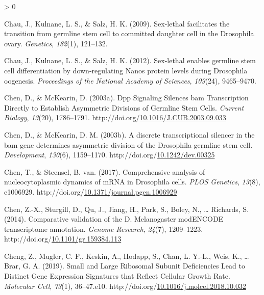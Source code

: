 \documentclass[12pt,oneside]{reedthesis}
\newlength{\cslhangindent}
\newenvironment{CSLReferences}[2] %
 {%
  \setlength{\parindent}{0pt}
  \ifodd #1 \everypar{\setlength{\hangindent}{\cslhangindent}}\ignorespaces\fi
  \ifnum #2 > 0
  \setlength{\parskip}{#2\baselineskip}
  \fi
 }%
 {}
\begin{document}
\begin{CSLReferences}{1}{0}
\leavevmode\hypertarget{ref-Chau2009}{}%
Chau, J., Kulnane, L. S., \& Salz, H. K. (2009). Sex-lethal facilitates the transition from germline stem cell to committed daughter cell in the {Drosophila} ovary. \emph{Genetics}, \emph{182}(1), 121--132.

\leavevmode\hypertarget{ref-Chau2012}{}%
Chau, J., Kulnane, L. S., \& Salz, H. K. (2012). Sex-lethal enables germline stem cell differentiation by down-regulating {Nanos} protein levels during {Drosophila} oogenesis. \emph{Proceedings of the National Academy of Sciences}, \emph{109}(24), 9465--9470.

\leavevmode\hypertarget{ref-Chen2003o}{}%
Chen, D., \& McKearin, D. (2003a). Dpp {Signaling Silences} bam {Transcription Directly} to {Establish Asymmetric Divisions} of {Germline Stem Cells}. \emph{Current Biology}, \emph{13}(20), 1786--1791. http://doi.org/\href{https://doi.org/10.1016/J.CUB.2003.09.033}{10.1016/J.CUB.2003.09.033}

\leavevmode\hypertarget{ref-Chen2003q}{}%
Chen, D., \& McKearin, D. M. (2003b). A discrete transcriptional silencer in the bam gene determines asymmetric division of the {Drosophila} germline stem cell. \emph{Development}, \emph{130}(6), 1159--1170. http://doi.org/\href{https://doi.org/10.1242/dev.00325}{10.1242/dev.00325}

\leavevmode\hypertarget{ref-chenComprehensiveAnalysisNucleocytoplasmic2017}{}%
Chen, T., \& Steensel, B. van. (2017). Comprehensive analysis of nucleocytoplasmic dynamics of {mRNA} in {Drosophila} cells. \emph{PLOS Genetics}, \emph{13}(8), e1006929. http://doi.org/\href{https://doi.org/10.1371/journal.pgen.1006929}{10.1371/journal.pgen.1006929}

\leavevmode\hypertarget{ref-chenComparativeValidationMelanogaster2014}{}%
Chen, Z.-X., Sturgill, D., Qu, J., Jiang, H., Park, S., Boley, N., \ldots{} Richards, S. (2014). Comparative validation of the {D}. Melanogaster {modENCODE} transcriptome annotation. \emph{Genome Research}, \emph{24}(7), 1209--1223. http://doi.org/\href{https://doi.org/10.1101/gr.159384.113}{10.1101/gr.159384.113}

\leavevmode\hypertarget{ref-chengSmallLargeRibosomal2019}{}%
Cheng, Z., Mugler, C. F., Keskin, A., Hodapp, S., Chan, L. Y.-L., Weis, K., \ldots{} Brar, G. A. (2019). Small and {Large Ribosomal Subunit Deficiencies Lead} to {Distinct Gene Expression Signatures} that {Reflect Cellular Growth Rate}. \emph{Molecular Cell}, \emph{73}(1), 36--47.e10. http://doi.org/\href{https://doi.org/10.1016/j.molcel.2018.10.032}{10.1016/j.molcel.2018.10.032}


\end{CSLReferences}
\end{document}
